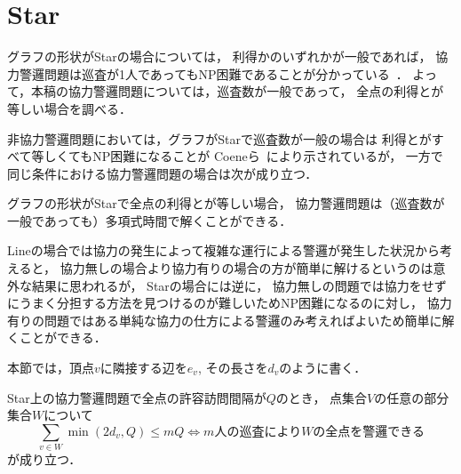 
\section{Star}
グラフの形状がStarの場合については，
利得か{\idletime}のいずれかが一般であれば，
協力警邏問題は巡査が1人であってもNP困難であることが分かっている~\cite{coene2011charlemagne}．
よって，本稿の協力警邏問題については，巡査数が一般であって，
全点の利得と{\idletime}が等しい場合を調べる．

非協力警邏問題においては，グラフがStarで巡査数が一般の場合は
利得と{\idletime}がすべて等しくてもNP困難になることが
Coeneら~\cite{coene2011charlemagne}により示されているが，
一方で同じ条件における協力警邏問題の場合は次が成り立つ．

\begin{theo}
  \label{theo:StarEqualProfitTimelimit}
  グラフの形状がStarで全点の利得と{\idletime}が等しい場合，
  協力警邏問題は（巡査数が一般であっても）多項式時間で解くことができる．
\end{theo}


Lineの場合では協力の発生によって複雑な運行による警邏が発生した状況から考えると，
協力無しの場合より協力有りの場合の方が簡単に解けるというのは意外な結果に思われるが，
Starの場合には逆に，
協力無しの問題では協力をせずにうまく分担する方法を見つけるのが難しいためNP困難になるのに対し，
協力有りの問題ではある単純な協力の仕方による警邏のみ考えればよいため簡単に解くことができる．


本節では，頂点$v$に隣接する辺を$e_v$, その長さを$d_v$のように書く．

\begin{lemm}
  \label{lemm:condition_of_guarding_star}
  Star上の協力警邏問題で全点の許容訪問間隔が$Q$のとき，
  点集合$V$の任意の部分集合$W$について
  $$
    \sum_{v \in W} \min(2d_v, Q) \leq mQ
    \iff \text{$m$人の巡査により$W$の全点を警邏できる}
  $$
  が成り立つ．
\end{lemm}





